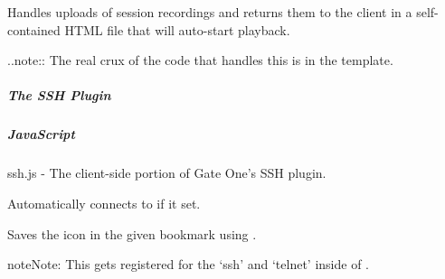 \documentclass[letterpaper,10pt,openany]{sphinxmanual}
\begin{document}
\begin{fulllineitems}
\label{Applications/terminal/plugin_playback:playback.save_recording}
Handles uploads of session recordings and returns them to the client in a
self-contained HTML file that will auto-start playback.

..note:: The real crux of the code that handles this is in the template.

\end{fulllineitems}



\subparagraph{The SSH Plugin}
\label{Applications/terminal/plugin_ssh:the-ssh-plugin}\label{Applications/terminal/plugin_ssh::doc}

\subparagraph{JavaScript}
\label{Applications/terminal/plugin_ssh:javascript}
ssh.js - The client-side portion of Gate One's SSH plugin.

\begin{fulllineitems}
\label{Applications/terminal/plugin_ssh:GateOne.SSH.autoConnect}
Automatically connects to  if it set.

\end{fulllineitems}


\begin{fulllineitems}
\label{Applications/terminal/plugin_ssh:GateOne.SSH.bookmarkIconHandler}
Saves the  icon in the given bookmark using .

\begin{notice}{note}{Note:}
This gets registered for the `ssh' and `telnet' inside of .
\end{notice}

\end{fulllineitems}

\end{document}
